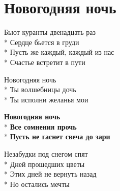 \vspace{\fill}\newpage

\section{Новогодняя ночь}
\label{song:Новогодняя_ночь}

\medskip

\begin{minipage}{\linewidth}
Бьют куранты двенадцать раз\\*
Сердце бьется в груди\\*
Пусть же каждый, каждый из нас\\*
Счастье встретит в пути\\
\end{minipage}\par\medskip\nobreak

\medskip

\begin{minipage}{\linewidth}
\hspace*{1.5em}Новогодняя ночь\\*
\hspace*{1.5em}Ты волшебницы дочь\\*
\hspace*{1.5em}Ты исполни желанья мои\\
\end{minipage}\par\medskip\nobreak

\medskip

\begin{minipage}{\linewidth}
\hspace*{1.5em}\textbf{Новогодняя ночь}\\*
\hspace*{1.5em}\textbf{Все сомнения прочь}\\*
\hspace*{1.5em}\textbf{Пусть не гаснет свеча до зари}\\
\end{minipage}\par\medskip\nobreak

\medskip

\begin{minipage}{\linewidth}
Незабудки под снегом спят\\*
Дней прошедших цветы\\*
Этих дней не вернуть назад\\*
Но остались мечты\\
\end{minipage}\par\medskip\nobreak

